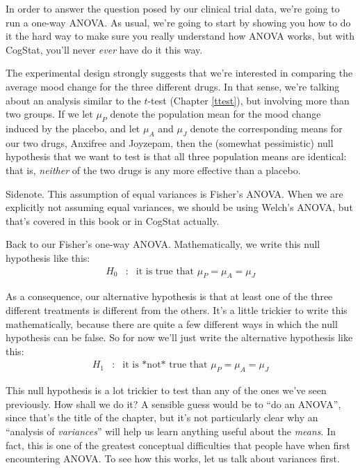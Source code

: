 \documentclass[
  11pt,
  a4paper,
  twoside,symmetric,openright]{book}
\theoremstyle{break}
\theoremstyle{break}
\begin{document}
In order to answer the question posed by our clinical trial data, we're going to run a one-way ANOVA. As usual, we're going to start by showing you how to do it the hard way to make sure you really understand how ANOVA works, but with CogStat, you'll never \emph{ever} have do it this way.

The experimental design strongly suggests that we're interested in comparing the average mood change for the three different drugs. In that sense, we're talking about an analysis similar to the \(t\)-test (Chapter \ref{ttest}), but involving more than two groups. If we let \(\mu_P\) denote the population mean for the mood change induced by the placebo, and let \(\mu_A\) and \(\mu_J\) denote the corresponding means for our two drugs, Anxifree and Joyzepam, then the (somewhat pessimistic) null hypothesis that we want to test is that all three population means are identical: that is, \emph{neither} of the two drugs is any more effective than a placebo.

Sidenote. This assumption of equal variances is Fisher's ANOVA. When we are explicitly not assuming equal variances, we should be using Welch's ANOVA, but that's covered in this book or in CogStat actually.

Back to our Fisher's one-way ANOVA. Mathematically, we write this null hypothesis like this:
\[
\begin{array}{rcl}
{H}_{0} &:& \mbox{it is true that } \mu_P = \mu_A = \mu_J
\end{array}
\]

As a consequence, our alternative hypothesis is that at least one of the three different treatments is different from the others. It's a little trickier to write this mathematically, because there are quite a few different ways in which the null hypothesis can be false. So for now we'll just write the alternative hypothesis like this:
\[
\begin{array}{rcl}
{H}_{1} &:& \mbox{it is *not* true that } \mu_P = \mu_A = \mu_J
\end{array}
\]

This null hypothesis is a lot trickier to test than any of the ones we've seen previously. How shall we do it? A sensible guess would be to ``do an ANOVA'', since that's the title of the chapter, but it's not particularly clear why an ``analysis of \emph{variances}'' will help us learn anything useful about the \emph{means}. In fact, this is one of the greatest conceptual difficulties that people have when first encountering ANOVA. To see how this works, let us talk about variances first.
\end{document}
